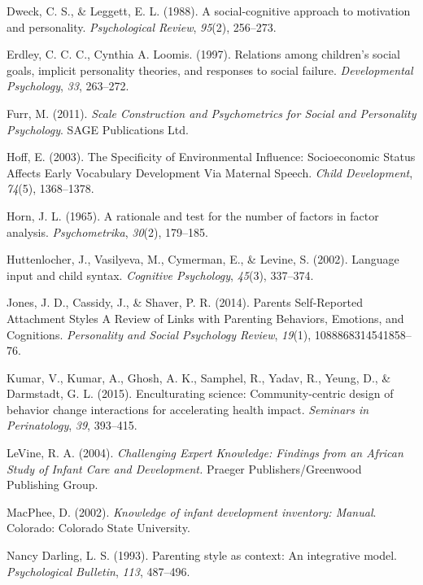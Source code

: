 \documentclass[floatsintext,man]{apa6}
\theoremstyle{definition}
\theoremstyle{definition}
\theoremstyle{definition}
\theoremstyle{remark}
\begin{document}
\hypertarget{ref-dweck1988}{}
Dweck, C. S., \& Leggett, E. L. (1988). A social-cognitive approach to
motivation and personality. \emph{Psychological Review}, \emph{95}(2),
256--273.

\hypertarget{ref-erdley1997}{}
Erdley, C. C. C., Cynthia A. Loomis. (1997). Relations among children's
social goals, implicit personality theories, and responses to social
failure. \emph{Developmental Psychology}, \emph{33}, 263--272.

\hypertarget{ref-furr2011}{}
Furr, M. (2011). \emph{Scale Construction and Psychometrics for Social
and Personality Psychology}. SAGE Publications Ltd.

\hypertarget{ref-hoff2003}{}
Hoff, E. (2003). The Specificity of Environmental Influence:
Socioeconomic Status Affects Early Vocabulary Development Via Maternal
Speech. \emph{Child Development}, \emph{74}(5), 1368--1378.

\hypertarget{ref-horn1965}{}
Horn, J. L. (1965). A rationale and test for the number of factors in
factor analysis. \emph{Psychometrika}, \emph{30}(2), 179--185.

\hypertarget{ref-huttenlocher2002}{}
Huttenlocher, J., Vasilyeva, M., Cymerman, E., \& Levine, S. (2002).
Language input and child syntax. \emph{Cognitive Psychology},
\emph{45}(3), 337--374.

\hypertarget{ref-jones2014}{}
Jones, J. D., Cassidy, J., \& Shaver, P. R. (2014). Parents
Self-Reported Attachment Styles A Review of Links with Parenting
Behaviors, Emotions, and Cognitions. \emph{Personality and Social
Psychology Review}, \emph{19}(1), 1088868314541858--76.

\hypertarget{ref-kumar2015}{}
Kumar, V., Kumar, A., Ghosh, A. K., Samphel, R., Yadav, R., Yeung, D.,
\& Darmstadt, G. L. (2015). Enculturating science: Community-centric
design of behavior change interactions for accelerating health impact.
\emph{Seminars in Perinatology}, \emph{39}, 393--415.

\hypertarget{ref-levine2004}{}
LeVine, R. A. (2004). \emph{Challenging Expert Knowledge: Findings from
an African Study of Infant Care and Development.} Praeger
Publishers/Greenwood Publishing Group.

\hypertarget{ref-macphee2002}{}
MacPhee, D. (2002). \emph{Knowledge of infant development inventory:
Manual}. Colorado: Colorado State University.

\hypertarget{ref-darling1993}{}
Nancy Darling, L. S. (1993). Parenting style as context: An integrative
model. \emph{Psychological Bulletin}, \emph{113}, 487--496.
\end{document}
